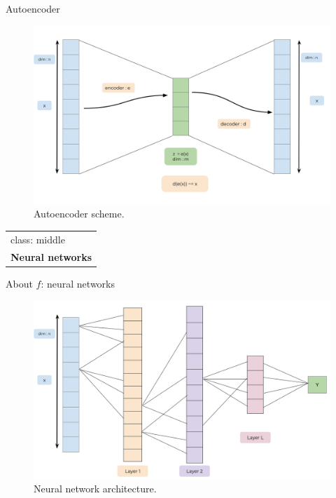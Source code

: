 \documentclass[
  ignorenonframetext,
]{beamer}
\begin{document}
\begin{frame}{Autoencoder}
\protect\hypertarget{autoencoder}{}
\begin{figure}

{\centering \includegraphics[width=0.9\linewidth]{images/Autoencoder} 

}

\caption{Autoencoder scheme.}\label{fig:unnamed-chunk-2}
\end{figure}

\begin{longtable}[]{@{}
  >{\raggedright\arraybackslash}p{}@{}}
\toprule
\endhead
class: middle \\
\textbf{Neural networks} \\
\bottomrule
\end{longtable}
\end{frame}

\begin{frame}{About \(f\): neural networks}
\protect\hypertarget{about-f-neural-networks}{}
\begin{figure}

{\centering \includegraphics[width=0.9\linewidth]{images/NeuralNetwork} 

}

\caption{Neural network architecture.}\label{fig:unnamed-chunk-3}
\end{figure}
\end{frame}
\end{document}
